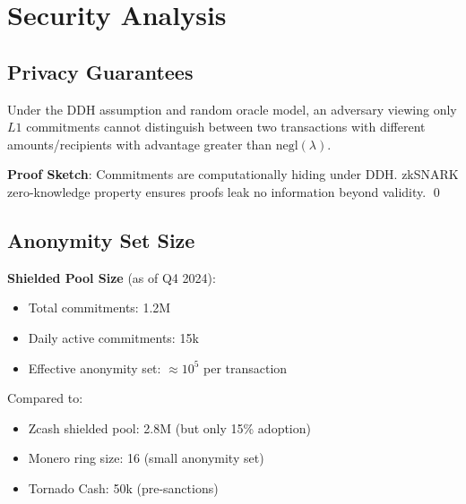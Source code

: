 \section{Security Analysis}


\subsection{Privacy Guarantees}

\begin{theorem}
Under the DDH assumption and random oracle model, an adversary viewing only $L1$ commitments cannot distinguish between two transactions with different amounts/recipients with advantage greater than $\text{negl}(\lambda)$.
\end{theorem}

\textbf{Proof Sketch}: Commitments are computationally hiding under DDH. zkSNARK zero-knowledge property ensures proofs leak no information beyond validity. \qed

\subsection{Anonymity Set Size}

\textbf{Shielded Pool Size} (as of Q4 2024):
\begin{itemize}[leftmargin=1.1em]
  \item Total commitments: 1.2M
  \item Daily active commitments: 15k
  \item Effective anonymity set: $\approx 10^5$ per transaction
\end{itemize}

Compared to:
\begin{itemize}[leftmargin=1.1em]
  \item Zcash shielded pool: 2.8M (but only 15\% adoption)
  \item Monero ring size: 16 (small anonymity set)
  \item Tornado Cash: 50k (pre-sanctions)
\end{itemize}

